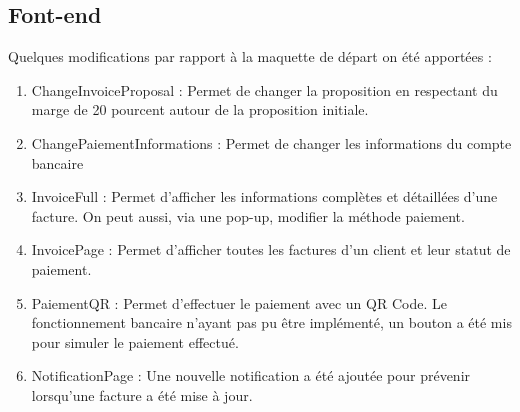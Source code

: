 \subsection{Font-end}

\begin{flushleft}
Quelques modifications par rapport à la maquette de départ on été apportées : 
\begin{enumerate}
    \item ChangeInvoiceProposal :\newline
    Permet de changer la proposition en respectant du marge de 20 pourcent autour de la proposition initiale.
    \item ChangePaiementInformations :\newline
    Permet de changer les informations du compte bancaire
    \item InvoiceFull :\newline
    Permet d'afficher les informations complètes et détaillées d'une facture. On peut aussi, via une pop-up, modifier la méthode paiement.
    \item InvoicePage :\newline
    Permet d'afficher toutes les factures d'un client et leur statut de paiement.
    \item PaiementQR :\newline
    Permet d'effectuer le paiement avec un QR Code. Le fonctionnement bancaire n'ayant pas pu être implémenté, un bouton a été mis pour simuler le paiement effectué.
    \item NotificationPage :\newline
    Une nouvelle notification a été ajoutée pour prévenir lorsqu'une facture a été mise à jour.
\end{enumerate}
\end{flushleft}

